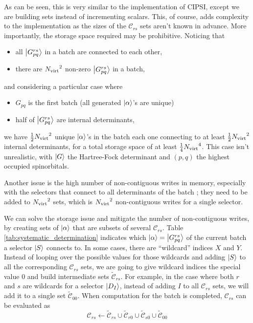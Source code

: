 \documentclass[./thesis.tex]{subfiles}
\begin{document}
As can be seen, this is very similar to the implementation of CIPSI, except we are building sets instead of incrementing scalars. This, of course, adds complexity to the implementation as the sizes of the $\mathcal{C}_{rs}$ sets aren't known in advance.
More importantly, the storage space required may be prohibitive. Noticing that 
\begin{itemize}
\item
all $\ket{G^{rs}_{pq}}$ in a batch are connected to each other,
\item
there are ${{N_\text{virt}}}^2$ non-zero $\ket{G^{rs}_{pq}}$ in a batch,
\end{itemize}
and considering a particular case where
\begin{itemize}
\item
$G_{pq}$ is the first batch (all generated ${\ket{\alpha}}$'s are unique)
\item
half of $\ket{G^{rs}_{pq}}$ are internal determinants,
\end{itemize}
we have $\frac{1}{2}{{N_\text{virt}}}^2$ unique ${\ket{\alpha}}$'s in the batch each one connecting to at least $\frac{1}{2}{{N_\text{virt}}}^2$ internal determinants, for a total storage space of at least $\frac{1}{4}{{N_\text{virt}}}^4$.
This case isn't unrealistic, with $\ket {G}$ the Hartree-Fock determinant and $(p,q)$ the highest occupied spinorbitals.

Another issue is the high number of non-contiguous writes in memory, especially with the selectors that connect to all determinants of the batch ; they need to be added to ${{N_\text{virt}}}^2$ sets, which is ${{N_\text{virt}}}^2$ non-contiguous writes for a single selector.

We can solve the storage issue and mitigate the number of non-contiguous writes, by creating sets of ${\ket{\alpha}}$ that are subsets of several $\mathcal{C}_{rs}$.
Table \ref{tab:systematic_determination} indicates which ${\ket{\alpha}} = \ket {G_{pq}^{rs}}$ of the current batch a selector $\ket{S}$ connects to. In some cases, there are ``wildcard'' indices $X$ and $Y$. Instead of looping over the possible values for those wildcards and adding $\ket{S}$ to all the corresponding $\mathcal{C}_{rs}$ sets, we are going to give wildcard indices the special value $0$ and build intermediate sets $\tilde{\mathcal{C}}_{rs}$. For example, in the case where both $r$ and $s$ are wildcards for a selector $\ket {D_I}$, instead of adding $I$ to all $\mathcal{C}_{rs}$ sets, we will add it to a single set $\tilde{\mathcal{C}}_{00}$. When computation for the batch is completed, $\mathcal{C}_{rs}$ can be evaluated as
\begin{equation}
\mathcal{C}_{rs} \gets \tilde{\mathcal{C}}_{rs} \cup \tilde{\mathcal{C}}_{r0} \cup \tilde{\mathcal{C}}_{s0} \cup \tilde{\mathcal{C}}_{00}
\end{equation}
\end{document}
